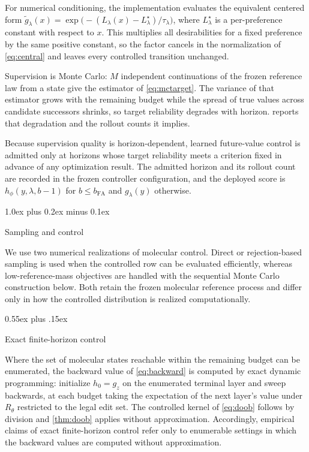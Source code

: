 \documentclass{article}
\makeatletter
\theoremstyle{definition}
\theoremstyle{remark}
\def\section{\@startsection{section}{1}{\z@}{-1.4ex plus -0.4ex minus -.2ex}%
  {1.0ex plus 0.2ex minus 0.1ex}{\large\sc\raggedright}}
\def\subsection{\@startsection{subsection}{2}{\z@}{-1.2ex plus -0.4ex minus -.2ex}%
  {0.55ex plus .15ex}{\normalsize\sc\raggedright}}
\makeatother
\begin{document}
For numerical conditioning, the implementation evaluates the equivalent centered form $\widetilde g_\lambda(x)=\exp\bigl(-(L_\lambda(x)-L^{\star}_\lambda)/\tau_\lambda\bigr)$, where $L^{\star}_\lambda$ is a per-preference constant with respect to $x$. This multiplies all desirabilities for a fixed preference by the same positive constant, so the factor cancels in the normalization of \eqref{eq:central} and leaves every controlled transition unchanged.

Supervision is Monte Carlo: $M$ independent continuations of the frozen reference law from a state give the estimator of \eqref{eq:mctarget}. The variance of that estimator grows with the remaining budget while the spread of true values across candidate successors shrinks, so target reliability degrades with horizon.  reports that degradation and the rollout counts it implies.

Because supervision quality is horizon-dependent, learned future-value control is admitted only at horizons whose target reliability meets a criterion fixed in advance of any optimization result. The admitted horizon and its rollout count are recorded in the frozen controller configuration, and the deployed score is $h_\phi(y,\lambda,b-1)$ for $b\le b_{\mathrm{FA}}$ and $g_\lambda(y)$ otherwise.

\section{Sampling and control}
\label{app:sampling}

We use two numerical realizations of molecular control. Direct or rejection-based sampling is used when the controlled row can be evaluated efficiently, whereas low-reference-mass objectives are handled with the sequential Monte Carlo construction below. Both retain the frozen molecular reference process and differ only in how the controlled distribution is realized computationally.

\subsection{Exact finite-horizon control}

Where the set of molecular states reachable within the remaining budget can be enumerated, the backward value of \eqref{eq:backward} is computed by exact dynamic programming: initialize $h_0=g_z$ on the enumerated terminal layer and sweep backwards, at each budget taking the expectation of the next layer's value under $R_\theta$ restricted to the legal edit set. The controlled kernel of \eqref{eq:doob} follows by division and \cref{thm:doob} applies without approximation. Accordingly, empirical claims of exact finite-horizon control refer only to enumerable settings in which the backward values are computed without approximation.
\end{document}
